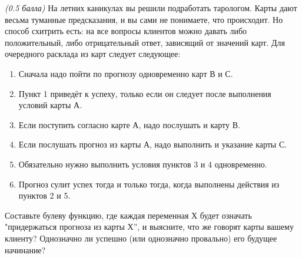 \question
\textit{(0.5 балла)} На летних каникулах вы решили подработать тарологом. Карты дают весьма туманные предсказания, и вы сами не понимаете, что происходит. Но способ схитрить есть: на все вопросы клиентов можно давать либо положительный, либо отрицательный ответ, зависящий от значений карт. Для очередного расклада из карт следует следующее:

\begin{enumerate}
\item Сначала надо пойти по прогнозу одновременно карт В и С.
\item Пункт 1 приведёт к успеху, только если он следует после выполнения условий карты А.
\item Если поступить согласно карте А, надо послушать и карту В.
\item Если послушать прогноз из карты А, надо выполнить и указание карты С.
\item Обязательно нужно выполнить условия пунктов 3 и 4 одновременно.
\item Прогноз сулит успех тогда и только тогда, когда выполнены действия из пунктов 2 и 5.
\end{enumerate}

Составьте булеву функцию, где каждая переменная Х будет означать "придержаться прогноза из карты Х”, и выясните, что же говорят карты вашему клиенту? Однозначно ли успешно (или однозначно провально) его будущее начинание?